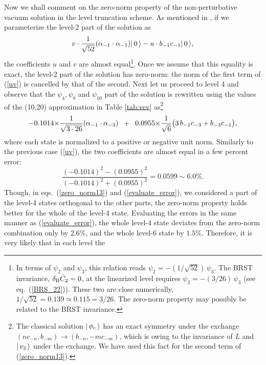 \documentclass[a4paper,12pt]{article}
\begin{document}
Now we shall comment on the zero-norm property of the non-perturbative
vacuum solution in the level truncation scheme.
As mentioned in \cite{SZ}, if we parameterize the level-2 part of the
solution as
\begin{equation}
\label{uv}
v\cdot\frac{1}{\sqrt{52}}(\alpha_{-1}\cdot\alpha_{-1})|\, 0\, \rangle - u \cdot b_{-1}c_{-1}|\, 0\, \rangle,
\end{equation}
the coefficients $u$ and $v$ are almost equal\footnote{
  In terms of $\psi_2$ and $\psi_3$, this
  relation reads $\psi_2 = -(1/\sqrt{52})\,\psi_3$. The BRST
  invariance,
  $\delta_{\text B}\bar C_2=0$, at the linearized level requires
  $\psi_2 =-(3/26)\,\psi_3$ (see eq.\ (\ref{BRS_22})).
  These two are close numerically,
  $1/\sqrt{52} = 0.139 \simeq 0.115 = 3/26$.
  The zero-norm property may possibly be related to the BRST
  invariance.
}.
Once we assume that this equality is exact, the level-2 part of the
solution has zero-norm: the norm of the first term of (\ref{uv}) is
cancelled by that of the second.
Next let us proceed to level 4 and observe that the
  $\psi_4,\psi_8$ and $\psi_{10}$ part of the solution
is rewritten
using the values of the (10,20) approximation in Table \ref{tab:vev}
as\footnote{
The classical solution $|\, \phi_{\text c}\, \rangle$ has an exact symmetry
under the exchange $(n c_{-n},b_{-m})\to (b_{-n},-m c_{-m})$,
which is owing to the invariance of $L$ and $|\, v_3\, \rangle$ under the
exchange.
We have used this fact for the second term of (\ref{zero_norm13}).
}
\begin{equation}
  \label{zero_norm13}
  -0.1014 \mbox{$\times$} \frac{1}{\sqrt{3\cdot 26}}(\alpha_{-1}\cdot\alpha_{-3})
  \;\;+\;\;0.0955 \mbox{$\times$} \frac{1}{\sqrt{6}}\bigl(3\,b_{-1}c_{-3}
         + b_{-3}c_{-1} \bigr),
\end{equation}
where each state is normalized to a positive or negative unit norm.
Similarly to the previous case (\ref{uv}), the two coefficients are
almost equal in a few percent error:
\begin{equation}
  \label{evaluate_error}
  \frac{(-0.1014)^2 - (0.0955)^2}{(-0.1014)^2 + (0.0955)^2}
     = 0.0599 \sim 6.0 \% .
\end{equation}
Though, in eqs.\ (\ref{zero_norm13}) and (\ref{evaluate_error}),
we considered a part of the level-4 states orthogonal to the
other parts, the zero-norm property holds better for the whole of the
level-4 state.
Evaluating the errors in the same manner as (\ref{evaluate_error}),
the whole level-4 state deviates from the zero-norm combination only
by $2.6 \%$, and the whole level-6 state by $1.5 \%$.
Therefore, it is very likely that in each level the
\end{document}

